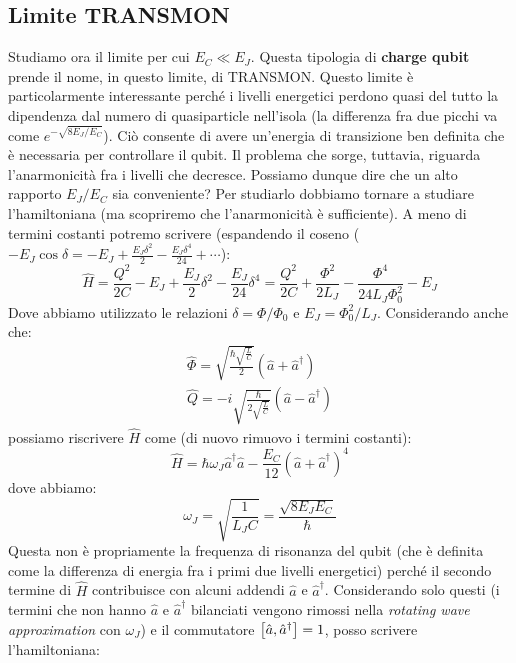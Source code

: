 \subsection{Limite TRANSMON}
Studiamo ora il limite per cui $E_C \ll E_J$. Questa tipologia di \textbf{charge qubit} prende il nome, in questo limite, di TRANSMON.
Questo limite è particolarmente interessante perché i livelli energetici perdono quasi del tutto la  dipendenza dal numero di quasiparticle nell'isola (la differenza fra due picchi va come $e^{-\sqrt{8E_J/E_C}}$). Ciò consente di avere un'energia di transizione ben definita che è necessaria per controllare il qubit. 
Il problema che sorge, tuttavia, riguarda l'anarmonicità fra i livelli che decresce. Possiamo dunque dire che un alto rapporto $E_J/E_C$ sia conveniente? Per studiarlo dobbiamo tornare a studiare l'hamiltoniana (ma scopriremo che l'anarmonicità è sufficiente).
A meno di termini costanti potremo scrivere (espandendo il coseno ($-E_J \cos \delta = - E_J + \frac{E_J \delta^2}{2} - \frac{E_J \delta^4}{24}+ \cdots$):
\begin{equation*}
    \hat H = \frac{Q^2}{2C}-E_J+ \frac{E_J}{2}\delta^2- \frac{E_J }{24}\delta^4 
    =\frac{Q^2}{2C}+\frac{\Phi^2}{2L_J}-\frac{\Phi^4}{24L_J \Phi^2_0} - E_J
\end{equation*}
Dove abbiamo utilizzato le relazioni $\delta=\Phi/\Phi_0$ e $E_J=\Phi^2_0/L_J$. Considerando anche che:
\begin{align*}
    \hat \Phi=\sqrt{\frac{\hbar \sqrt{\frac{L}{C}}}{2}}(\hat a+\hat a^\dagger) \\
    \hat Q=-i\sqrt{\frac{\hbar}{2\sqrt{\frac{L}{C}}}}(\hat a-\hat a^\dagger)
\end{align*}
possiamo riscrivere $\hat H$ come (di nuovo rimuovo i termini costanti):
\begin{equation*}
    \hat H = \hbar \omega_J \hat a^\dagger \hat a - \frac{E_C}{12}(\hat a+\hat a^\dagger)^4
\end{equation*}
dove abbiamo:
\begin{equation*}
    \omega_J = \sqrt{\frac{1}{L_J C}}= \frac{\sqrt{8E_J E_C}}{\hbar}
\end{equation*}
Questa non è propriamente la frequenza di risonanza del qubit (che è definita come la differenza di energia fra i primi due livelli energetici) perché il secondo termine di $\hat H$ contribuisce con alcuni addendi $\hat a$ e $\hat a^\dagger$. Considerando solo questi (i termini che non hanno $\hat a$ e $\hat a^\dagger$ bilanciati vengono rimossi nella \textit{rotating wave approximation} con $\omega_J$) e il commutatore $\comm{\hat a}{\hat a^\dagger}=1$,  posso scrivere l'hamiltoniana:
